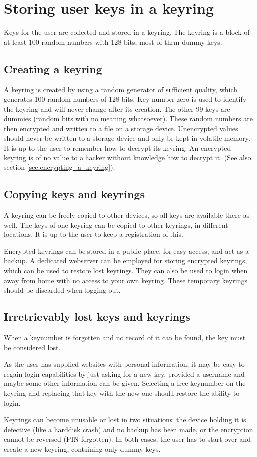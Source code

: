 %
%
%
\section{Storing user keys in a keyring}
\label{sec:keyring}
Keys for the user are collected and stored in a keyring.
The keyring is a block of at least 100 random numbers with 128 bits, most of them dummy keys.

\subsection{Creating a keyring}
A keyring is created by using a random generator of sufficient quality,
which generates 100 random numbers of 128 bits.
Key number zero is used to identify the keyring and will never change after its creation.
The other 99 keys are dummies
(random bits with no meaning whatsoever).
These random numbers are then encrypted and written to a file on a storage device.
Unencrypted values should never be written to a storage device and only be kept in volatile memory.
It is up to the user to remember how to decrypt its keyring.
An encrypted keyring is of no value to a hacker without knowledge how to decrypt it.
(See also section \ref{sec:encrypting_a_keyring}).

\subsection{Copying keys and keyrings}
A keyring can be freely copied to other devices, so all keys are available there as well.
The keys of one keyring can be copied to other keyrings, in different locations.
It is up to the user to keep a registration of this.
\par
Encrypted keyrings can be stored in a public place, for easy access, and act as a backup.
A dedicated webserver can be employed for storing encrypted keyrings,
which can be used to restore lost keyrings.
They can also be used to login when away from home with no access to your own keyring.
These temporary keyrings should be discarded when logging out.

\subsection{Irretrievably lost keys and keyrings}
When a keynumber is forgotten and no record of it can be found,
the key must be considered lost.
\par
As the user has supplied websites with personal information,
it may be easy to regain login capabilities by just asking for a new key,
provided a username and maybe some other information can be given.
Selecting a free keynumber on the keyring and replacing that key with the new one should restore the ability to login.
\par
Keyrings can become unusable or lost in two situations:
the device holding it is defective (like a harddisk crash) and no backup has been made,
or the encryption cannot be reversed (PIN forgotten).
In both cases, the user has to start over and create a new keyring, containing only dummy keys.
